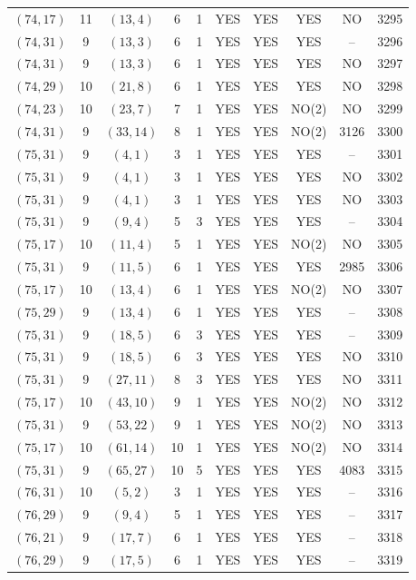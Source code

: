 \begin{longtable}{|c|c|c|c|c|c|c|c|c|c|}
$(74, 17)$ & 11 & $(13, 4)$ & 6 & 1 & YES & YES & YES & NO & 3295\\
$(74, 31)$ & 9 & $(13, 3)$ & 6 & 1 & YES & YES & YES & -- & 3296\\
$(74, 31)$ & 9 & $(13, 3)$ & 6 & 1 & YES & YES & YES & NO & 3297\\
$(74, 29)$ & 10 & $(21, 8)$ & 6 & 1 & YES & YES & YES & NO & 3298\\
$(74, 23)$ & 10 & $(23, 7)$ & 7 & 1 & YES & YES & NO(2) & NO & 3299\\
$(74, 31)$ & 9 & $(33, 14)$ & 8 & 1 & YES & YES & NO(2) & 3126 & 3300\\
$(75, 31)$ & 9 & $(4, 1)$ & 3 & 1 & YES & YES & YES & -- & 3301\\
$(75, 31)$ & 9 & $(4, 1)$ & 3 & 1 & YES & YES & YES & NO & 3302\\
$(75, 31)$ & 9 & $(4, 1)$ & 3 & 1 & YES & YES & YES & NO & 3303\\
$(75, 31)$ & 9 & $(9, 4)$ & 5 & 3 & YES & YES & YES & -- & 3304\\
$(75, 17)$ & 10 & $(11, 4)$ & 5 & 1 & YES & YES & NO(2) & NO & 3305\\
$(75, 31)$ & 9 & $(11, 5)$ & 6 & 1 & YES & YES & YES & 2985 & 3306\\
$(75, 17)$ & 10 & $(13, 4)$ & 6 & 1 & YES & YES & NO(2) & NO & 3307\\
$(75, 29)$ & 9 & $(13, 4)$ & 6 & 1 & YES & YES & YES & -- & 3308\\
$(75, 31)$ & 9 & $(18, 5)$ & 6 & 3 & YES & YES & YES & -- & 3309\\
$(75, 31)$ & 9 & $(18, 5)$ & 6 & 3 & YES & YES & YES & NO & 3310\\
$(75, 31)$ & 9 & $(27, 11)$ & 8 & 3 & YES & YES & YES & NO & 3311\\
$(75, 17)$ & 10 & $(43, 10)$ & 9 & 1 & YES & YES & NO(2) & NO & 3312\\
$(75, 31)$ & 9 & $(53, 22)$ & 9 & 1 & YES & YES & NO(2) & NO & 3313\\
$(75, 17)$ & 10 & $(61, 14)$ & 10 & 1 & YES & YES & NO(2) & NO & 3314\\
$(75, 31)$ & 9 & $(65, 27)$ & 10 & 5 & YES & YES & YES & 4083 & 3315\\
$(76, 31)$ & 10 & $(5, 2)$ & 3 & 1 & YES & YES & YES & -- & 3316\\
$(76, 29)$ & 9 & $(9, 4)$ & 5 & 1 & YES & YES & YES & -- & 3317\\
$(76, 21)$ & 9 & $(17, 7)$ & 6 & 1 & YES & YES & YES & -- & 3318\\
$(76, 29)$ & 9 & $(17, 5)$ & 6 & 1 & YES & YES & YES & -- & 3319\\

\end{longtable}
